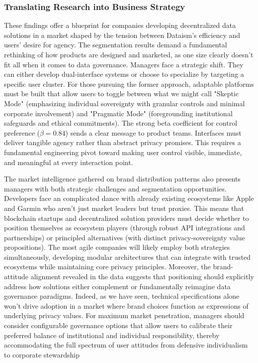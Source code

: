 	\subsubsection{Translating Research into Business Strategy}
	These findings offer a blueprint for companies developing decentralized data solutions in a market shaped by the tension between Dataism's efficiency and users' desire for agency. The segmentation results demand a fundamental rethinking of how products are designed and marketed, as one size clearly doesn't fit all when it comes to data governance. Managers face a strategic shift. They can either develop dual-interface systems or choose to specialize by targeting a specific user cluster. For those pursuing the former approach, adaptable platforms must be built that allow users to toggle between what we might call "Skeptic Mode" (emphasizing individual sovereignty with granular controls and minimal corporate involvement) and "Pragmatic Mode" (foregrounding institutional safeguards and ethical commitments). The strong beta coefficient for control preference ($\beta = 0.84$) sends a clear message to product teams. Interfaces must deliver tangible agency rather than abstract privacy promises. This requires a fundamental engineering pivot toward making user control visible, immediate, and meaningful at every interaction point.

	The market intelligence gathered on brand distribution patterns also presents managers with both strategic challenges and segmentation opportunities. Developers face an complicated dance with already existing ecosystems like Apple and Garmin who aren't just market leaders but trust proxies. This means that blockchain startups and decentralized solution providers must decide whether to position themselves as ecosystem players (through robust API integrations and partnerships) or principled alternatives (with distinct privacy-sovereignty value propositions). The most agile companies will likely employ both strategies simultaneously, developing modular architectures that can integrate with trusted ecosystems while maintaining core privacy principles. Moreover, the brand-attitude alignment revealed in the data suggests that positioning should explicitly address how solutions either complement or fundamentally reimagine data governance paradigms. Indeed, as we have seen, technical specifications alone won't drive adoption in a market where brand choices function as expressions of underlying privacy values. For maximum market penetration, managers should consider configurable governance options that allow users to calibrate their preferred balance of institutional and individual responsibility, thereby accommodating the full spectrum of user attitudes from defensive individualism to corporate stewardship
